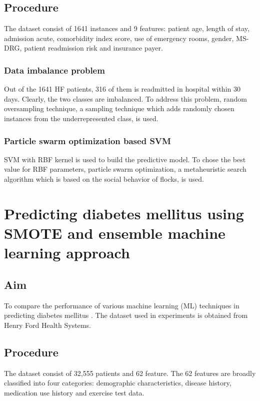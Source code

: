 \documentclass[twoside]{iitbreport}
\begin{document}
\subsection{Procedure}
The dataset consist of 1641 instances and 9 features: patient age, length of stay, admission acute, comorbidity index score, use of emergency rooms, gender, MS-DRG, patient readmission risk and insurance payer. 

\subsubsection{Data imbalance problem}
Out of the 1641 HF patients, 316 of them is readmitted in hospital within 30 days. Clearly, the two classes are imbalanced. To address this problem, random oversampling technique, a sampling technique which adds randomly chosen instances from the underrepresented class, is used.

\subsubsection{Particle swarm optimization based SVM}
SVM with RBF kernel is used to build the predictive model. To chose the best value for RBF parameters, particle swarm optimization, a metaheuristic search algorithm which is based on the social behavior of flocks, is used.  


\section{Predicting diabetes mellitus using SMOTE and ensemble machine learning approach}
\subsection{Aim}
To compare the performance of various machine learning (ML) techniques in predicting diabetes mellitus \cite{alghamdi2017predicting}. The dataset used in experiments is obtained from Henry Ford Health Systems. 

\subsection{Procedure}
The dataset consist of 32,555 patients and 62 feature. The 62 features are broadly classified into four categories: demographic characteristics, disease history, medication use history and exercise test data.
\end{document}
